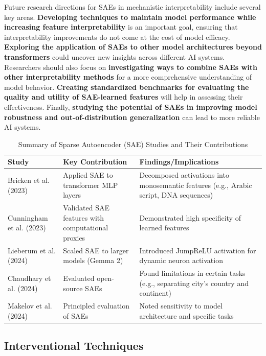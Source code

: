 \documentclass[sigconf,authoryear]{acmart}
\begin{document}
  Future research directions for SAEs in mechanistic interpretability include several key areas. \textbf{Developing techniques to maintain model performance while increasing feature interpretability} is an important goal, ensuring that interpretability improvements do not come at the cost of model efficacy. \textbf{Exploring the application of SAEs to other model architectures beyond transformers} could uncover new insights across different AI systems. Researchers should also focus on \textbf{investigating ways to combine SAEs with other interpretability methods} for a more comprehensive understanding of model behavior. \textbf{Creating standardized benchmarks for evaluating the quality and utility of SAE-learned features} will help in assessing their effectiveness. Finally, \textbf{studying the potential of SAEs in improving model robustness and out-of-distribution generalization} can lead to more reliable AI systems.
  
\begin{table}[h]
  \centering
  \footnotesize
  \begin{tabular}{|p{2cm}|p{2.5cm}|p{2.5cm}|}
  \hline
  \textbf{Study} & \textbf{Key Contribution} & \textbf{Findings/Implications} \\
  \hline
  Bricken et al. (2023) & Applied SAE to transformer MLP layers & 
  Decomposed activations into monosemantic features (e.g., Arabic script, DNA sequences) \\
  \hline
  Cunningham et al. (2023) & Validated SAE features with computational proxies & 
  Demonstrated high specificity of learned features \\
  \hline
  Lieberum et al. (2024) & Scaled SAE to larger models (Gemma 2) & 
  Introduced JumpReLU activation for dynamic neuron activation \\
  \hline
  Chaudhary et al. (2024) & Evaluated open-source SAEs & 
  Found limitations in certain tasks (e.g., separating city's country and continent) \\
  \hline
  Makelov et al. (2024) & Principled evaluation of SAEs & 
  Noted sensitivity to model architecture and specific tasks \\
  \hline
  \end{tabular}
  \caption{Summary of Sparse Autoencoder (SAE) Studies and Their Contributions}
  \label{tab:sae_studies}
  \end{table}

  \subsection{Interventional Techniques}
\end{document}
